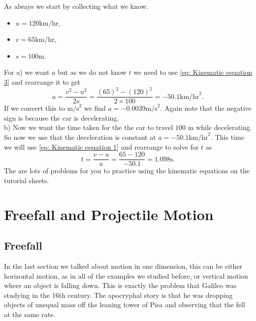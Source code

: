 \documentclass[a4paper,12pt]{book}
\begin{document}
As always we start by collecting what we know.
\begin{itemize}
\setlength{\itemsep}{-5pt}
    \item $u=120\text{km/hr}$,
    \item $v=65\text{km/hr}$,
    \item $s=100\text{m}$.
\end{itemize}

For a) we want $a$ but as we do not know $t$ we need to use \cref{eq: Kinematic equation 3} and rearrange it to get
\begin{equation*}
    a=\frac{v^{2}-u^{2}}{2s}=\frac{(65)^{2}-(120)^{2}}{2\times 100}=-50.1\text{km/hr}^{2}.
\end{equation*}
If we convert this to $\text{m/s}^{2}$ we find $a=-0.0039\text{m/s}^{2}$. Again note that the negative sign is because the car is decelerating.\\

b) Now we want the time taken for the the car to travel $100$ m while decelerating. So now we use that the deceleration is constant at $a=-50.1\text{km/hr}^{2}$. This time we will use \cref{eq: Kinematic equation 1} and rearrange to solve for $t$ as
\begin{equation*}
    t=\frac{v-u}{a}=\frac{65-120}{-50.1}=1.098 \text{s}.
\end{equation*}
The are lots of problems for you to practice using the kinematic equations on the tutorial sheets.


\chapter{Freefall and Projectile Motion}

\section{Freefall}
In the last section we talked about motion in one dimension, this can be either horizontal motion, as in all of the examples we studied before, or vertical motion where an object is falling down. This is exactly the problem that Galileo was studying in the 16th century. The apocryphal story is that he was dropping objects of unequal mass off the leaning tower of Pisa and observing that the fell at the same rate. \\
\end{document}
